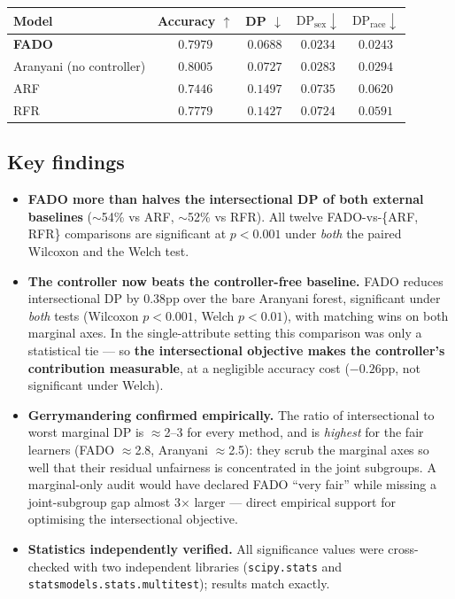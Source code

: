 \documentclass[11pt,a4paper]{article}
\begin{document}
\begin{center}
\renewcommand{\arraystretch}{1.2}
\begin{tabular}{l cccc}
\toprule
Model & Accuracy $\uparrow$ & DP $\downarrow$ & $\mathrm{DP}_{\text{sex}}\downarrow$ & $\mathrm{DP}_{\text{race}}\downarrow$ \\
\midrule
\textbf{FADO}            & $0.7979$          & $\mathbf{0.0688}$ & $\mathbf{0.0234}$ & $\mathbf{0.0243}$ \\
Aranyani (no controller) & $\mathbf{0.8005}$ & $0.0727$          & $0.0283$          & $0.0294$ \\
ARF                      & $0.7446$          & $0.1497$          & $0.0735$          & $0.0620$ \\
RFR                      & $0.7779$          & $0.1427$          & $0.0724$          & $0.0591$ \\
\bottomrule
\end{tabular}
\end{center}

\subsection*{Key findings}
\begin{itemize}
  \item \textbf{FADO more than halves the intersectional DP of both external baselines}
        ($\sim$54\% vs ARF, $\sim$52\% vs RFR). All twelve FADO-vs-\{ARF, RFR\} comparisons
        are significant at $p<0.001$ under \emph{both} the paired Wilcoxon and the Welch test.
  \item \textbf{The controller now beats the controller-free baseline.} FADO reduces
        intersectional DP by $0.38$pp over the bare Aranyani forest, significant under
        \emph{both} tests (Wilcoxon $p<0.001$, Welch $p<0.01$), with matching wins on both
        marginal axes. In the single-attribute setting this comparison was only a statistical
        tie --- so \textbf{the intersectional objective makes the controller's contribution
        measurable}, at a negligible accuracy cost ($-0.26$pp, not significant under Welch).
  \item \textbf{Gerrymandering confirmed empirically.} The ratio of intersectional to worst
        marginal DP is $\approx$2--3 for every method, and is \emph{highest} for the fair
        learners (FADO $\approx$2.8, Aranyani $\approx$2.5): they scrub the marginal axes so
        well that their residual unfairness is concentrated in the joint subgroups. A
        marginal-only audit would have declared FADO ``very fair'' while missing a
        joint-subgroup gap almost 3$\times$ larger --- direct empirical support for optimising
        the intersectional objective.
  \item \textbf{Statistics independently verified.} All significance values were cross-checked
        with two independent libraries (\texttt{scipy.stats} and
        \texttt{statsmodels.stats.multitest}); results match exactly.
\end{itemize}
\end{document}
